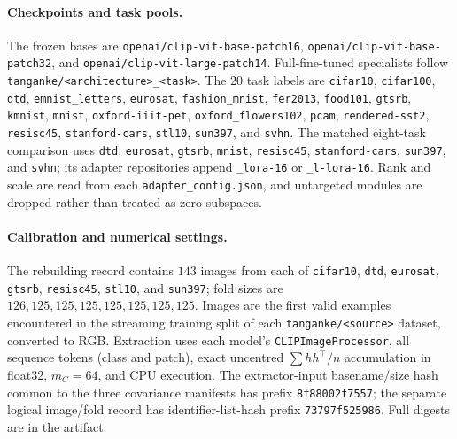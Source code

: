 \paragraph{Checkpoints and task pools.}
The frozen bases are \texttt{openai/clip-vit-base-patch16},
\texttt{openai/clip-vit-base-patch32}, and \texttt{openai/clip-vit-large-patch14}. Full-fine-tuned
specialists follow \texttt{tanganke/<architecture>\_<task>}. The $20$ task labels are
\texttt{cifar10}, \texttt{cifar100}, \texttt{dtd}, \texttt{emnist\_letters}, \texttt{eurosat},
\texttt{fashion\_mnist}, \texttt{fer2013}, \texttt{food101}, \texttt{gtsrb}, \texttt{kmnist},
\texttt{mnist}, \texttt{oxford-iiit-pet}, \texttt{oxford\_flowers102}, \texttt{pcam},
\texttt{rendered-sst2}, \texttt{resisc45}, \texttt{stanford-cars}, \texttt{stl10},
\texttt{sun397}, and \texttt{svhn}. The matched eight-task comparison uses \texttt{dtd},
\texttt{eurosat}, \texttt{gtsrb}, \texttt{mnist}, \texttt{resisc45}, \texttt{stanford-cars},
\texttt{sun397}, and \texttt{svhn}; its adapter repositories append \texttt{\_lora-16} or
\texttt{\_l-lora-16}. Rank and scale are read from each \texttt{adapter\_config.json}, and
untargeted modules are dropped rather than treated as zero subspaces.

\paragraph{Calibration and numerical settings.}
The rebuilding record contains $143$ images from each of \texttt{cifar10}, \texttt{dtd},
\texttt{eurosat}, \texttt{gtsrb}, \texttt{resisc45}, \texttt{stl10}, and \texttt{sun397}; fold
sizes are $126,125,125,125,125,125,125,125$. Images are the first valid examples encountered in
the streaming training split of each \texttt{tanganke/<source>} dataset, converted to RGB.
Extraction uses each model's \texttt{CLIPImageProcessor}, all sequence tokens (class and patch), exact uncentred
$\sum h h^\top/n$ accumulation in float32, $m_C=64$, and CPU execution. The extractor-input
basename/size hash common to the three covariance manifests has prefix \texttt{8f88002f7557}; the separate logical image/fold
record has identifier-list-hash prefix \texttt{73797f525986}. Full digests are in the artifact.

